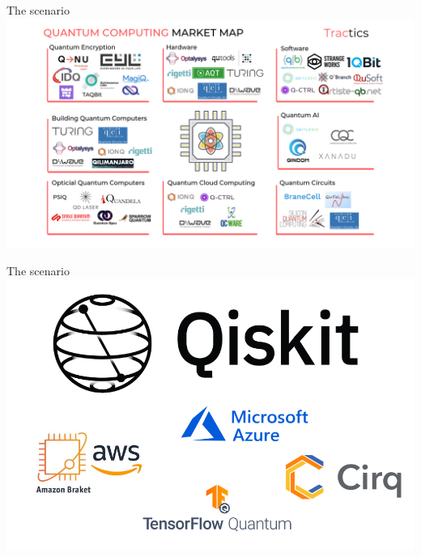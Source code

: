 \begin{frame}{The scenario}
    \includegraphics[width=\textwidth]{img/lec1/qc_landscape.png}
\end{frame}


\begin{frame}{The scenario}
    \includegraphics[width=\textwidth]{img/lec1/qc_landscape_zoom.png}
\end{frame}

